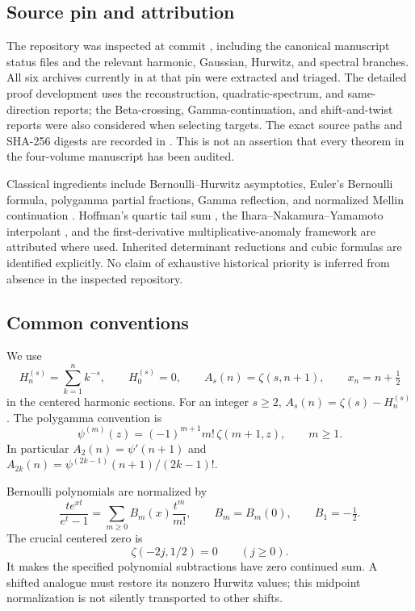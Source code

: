 \subsection{Source pin and attribution}

The repository was inspected at commit \sourcepin, including the
canonical manuscript status files and the relevant harmonic, Gaussian,
Hurwitz, and spectral branches.  All six archives currently in
 at that pin were extracted and triaged.  The detailed
proof development uses the reconstruction, quadratic-spectrum, and
same-direction reports; the Beta-crossing, Gamma-continuation, and
shift-and-twist reports were also considered when selecting targets.
The exact source paths and SHA-256 digests are recorded in
.  This is not an assertion that every theorem in
the four-volume manuscript has been audited.

Classical ingredients include Bernoulli--Hurwitz asymptotics, Euler's
Bernoulli formula, polygamma partial fractions, Gamma reflection, and
normalized Mellin continuation \cite{DLMF}.  Hoffman's quartic tail
sum \cite{Hoffman}, the Ihara--Nakamura--Yamamoto interpolant
\cite{INY}, and the first-derivative multiplicative-anomaly framework
\cite{EVZ,PolynomialAnomaly} are attributed where used.  Inherited
determinant reductions and cubic formulas are identified explicitly.
No claim of exhaustive historical priority is inferred from absence in
the inspected repository.

\subsection{Common conventions}

We use
\[
 H_n^{(s)}=\sum_{k=1}^n k^{-s},\qquad H_0^{(s)}=0,\qquad
 A_s(n)=\zeta(s,n+1),\qquad x_n=n+\tfrac12
\]
in the centered harmonic sections.  For an integer $s\ge2$,
$A_s(n)=\zeta(s)-H_n^{(s)}$.  The polygamma convention is
\[
 \psi^{(m)}(z)=(-1)^{m+1}m!\,\zeta(m+1,z),\qquad m\ge1.
\]
In particular $A_2(n)=\psi'(n+1)$ and
$A_{2k}(n)=\psi^{(2k-1)}(n+1)/(2k-1)!$.

Bernoulli polynomials are normalized by
\[
 \frac{te^{xt}}{e^t-1}=\sum_{m\ge0}B_m(x)\frac{t^m}{m!},
 \qquad B_m=B_m(0),\qquad B_1=-\tfrac12.
\]
The crucial centered zero is
\[
 \zeta(-2j,1/2)=0\qquad(j\ge0).
\]
It makes the specified polynomial subtractions have zero continued
sum.  A shifted analogue must restore its nonzero Hurwitz values;
this midpoint normalization is not silently transported to other shifts.

